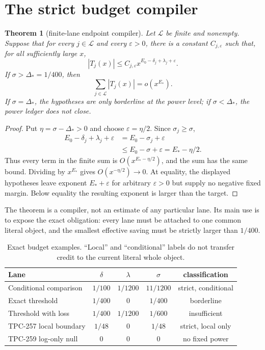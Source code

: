 \documentclass[11pt]{article}
\newtheorem{theorem}{Theorem}
\theoremstyle{definition}
\begin{document}
\section{The strict budget compiler}

\begin{theorem}[finite-lane endpoint compiler]
Let $\mathcal L$ be finite and nonempty.  Suppose that for every $j\in\mathcal L$
and every $\varepsilon>0$, there is a constant $C_{j,\varepsilon}$ such that,
for all sufficiently large $x$,
\begin{equation}
 |T_j(x)|\leq C_{j,\varepsilon}
 x^{E_0-\delta_j+\lambda_j+\varepsilon}.
 \label{eq:lane-bound}
\end{equation}
If $\sigma>\Delta_*=1/400$, then
\begin{equation}
 \sum_{j\in\mathcal L}|T_j(x)|=o(x^{E_*}).
 \label{eq:target}
\end{equation}
If $\sigma=\Delta_*$, the hypotheses are only borderline at the power level;
if $\sigma<\Delta_*$, the power ledger does not close.
\end{theorem}

\begin{proof}
Put $\eta=\sigma-\Delta_*>0$ and choose
$\varepsilon=\eta/2$.  Since $\sigma_j\geq\sigma$,
\begin{align*}
 E_0-\delta_j+\lambda_j+\varepsilon
 &=E_0-\sigma_j+\varepsilon\\
 &\leq E_0-\sigma+\varepsilon
 =E_*-\eta/2.
\end{align*}
Thus every term in the finite sum is $O(x^{E_*-\eta/2})$, and the sum has the
same bound.  Dividing by $x^{E_*}$ gives $O(x^{-\eta/2})\to0$.  At equality,
the displayed hypotheses leave exponent $E_*+\varepsilon$ for arbitrary
$\varepsilon>0$ but supply no negative fixed margin.  Below equality the
resulting exponent is larger than the target.  \end{proof}

The theorem is a compiler, not an estimate of any particular lane.  Its main
use is to expose the exact obligation: every lane must be attached to one
common literal object, and the smallest effective saving must be strictly
larger than $1/400$.

\begin{table}[t]
\centering
\caption{Exact budget examples.  ``Local'' and ``conditional'' labels do not
transfer credit to the current literal whole object.}
\label{tab:budget}
\begin{tabular}{lcccc}
\toprule
Lane & $\delta$ & $\lambda$ & $\sigma$ & classification\\
\midrule
Conditional comparison & $1/100$ & $1/1200$ & $11/1200$ & strict, conditional\\
Exact threshold & $1/400$ & $0$ & $1/400$ & borderline\\
Threshold with loss & $1/400$ & $1/1200$ & $1/600$ & insufficient\\
TPC-257 local boundary & $1/48$ & $0$ & $1/48$ & strict, local only\\
TPC-259 log-only null & $0$ & $0$ & $0$ & no fixed power\\
\bottomrule
\end{tabular}
\end{table}
\end{document}
